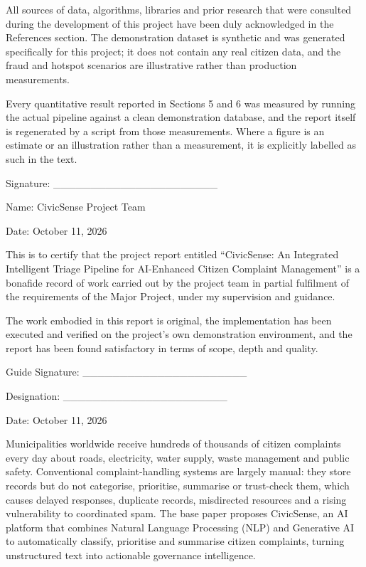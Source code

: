 \documentclass[10pt,letterpaper,oneside]{article}\usepackage{geometry}\geometry{top=1in,bottom=1in,left=1in,right=1in,includeheadfoot}\usepackage{xcolor}\definecolor{color@navy}{HTML}{1F3B63}\definecolor{color@grey}{HTML}{404040}\definecolor{color@hdr}{HTML}{F2F4F7}\usepackage{titlesec}\titleformat{\section}  {\normalfont\huge\bfseries\color@navy}  {}{0pt}{\MakeUppercase}\titleformat{\subsection}  {\normalfont\Large\bfseries\color@navy}  {}{0pt}{}\titleformat{\subsubsection}  {\normalfont\large\bfseries\color@navy}  {}{0pt}{}\titlespacing*{\section}{0pt}{14pt}{6pt}\titlespacing*{\subsection}{0pt}{10pt}{4pt}\titlespacing*{\subsubsection}{0pt}{8pt}{3pt}\setlength{\parindent}{0pt}\setlength{\parskip}{0.6em}\parindent=0pt\usepackage{enumitem}\setlist{nosep,leftmargin=*,itemsep=0pt,topsep=2pt,partopsep=0pt}\usepackage{array}\usepackage{booktabs}\usepackage{caption}\captionsetup{font={small,it},labelfont={bf},labelsep=period,  parskip=2pt,skip=4pt,list=no}\captionsetup[table]{labelfont={bf,small,color@navy},name=Table}\usepackage{graphicx}\usepackage{verbatim}\usepackage{ragged2e}\usepackage{longtable}\usepackage{tabularx}\usepackage{multirow}\usepackage{colortbl}\definecolor{rowshade}{HTML}{F2F4F7}\usepackage{tikz}\usetikzlibrary{positioning,calc}\usepackage[hidelinks]{hyperref}\hypersetup{colorlinks=true,linkcolor=color@navy,urlcolor=color@navy}\pagestyle{fancy}\fancyhf{}\renewcommand{\headrulewidth}{0.4pt}\fancyhead[L]{\small\color@navy CivicSense — Project Report}\fancyhead[R]{\small\color@grey October 11, 2026}\fancyfoot[C]{\small\color@grey An Integrated Intelligent Triage Pipelin}\fancyfoot[R]{\small\color@grey Page \thepage}\usepackage{setspace}\setstretch{1.15}\AtBeginDocument{  \hypersetup{pdftitle={An Integrated Intelligent Triage Pipeline for AI-Enhanced Citizen Complaint Management},    pdfauthor={CivicSense Project Team},    pdfsubject={Project Report},    pdfkeywords={smart cities, NLP, complaint management, e-governance},    pdfcreator={CivicSense Project Team}  }}
\begin{document}
All sources of data, algorithms, libraries and prior research that were consulted during the development of this project have been duly acknowledged in the References section. The demonstration dataset is synthetic and was generated specifically for this project; it does not contain any real citizen data, and the fraud and hotspot scenarios are illustrative rather than production measurements.

Every quantitative result reported in Sections 5 and 6 was measured by running the actual pipeline against a clean demonstration database, and the report itself is regenerated by a script from those measurements. Where a figure is an estimate or an illustration rather than a measurement, it is explicitly labelled as such in the text.

Signature: ______________________

Name: CivicSense Project Team

Date: October 11, 2026

\clearpage
{}

This is to certify that the project report entitled “CivicSense: An Integrated Intelligent Triage Pipeline for AI-Enhanced Citizen Complaint Management” is a bonafide record of work carried out by the project team in partial fulfilment of the requirements of the Major Project, under my supervision and guidance.

The work embodied in this report is original, the implementation has been executed and verified on the project’s own demonstration environment, and the report has been found satisfactory in terms of scope, depth and quality.

Guide Signature: ______________________

Designation: ______________________

Date: October 11, 2026

\clearpage
{}

Municipalities worldwide receive hundreds of thousands of citizen complaints every day about roads, electricity, water supply, waste management and public safety. Conventional complaint-handling systems are largely manual: they store records but do not categorise, prioritise, summarise or trust-check them, which causes delayed responses, duplicate records, misdirected resources and a rising vulnerability to coordinated spam. The base paper proposes CivicSense, an AI platform that combines Natural Language Processing (NLP) and Generative AI to automatically classify, prioritise and summarise citizen complaints, turning unstructured text into actionable governance intelligence.
\end{document}
